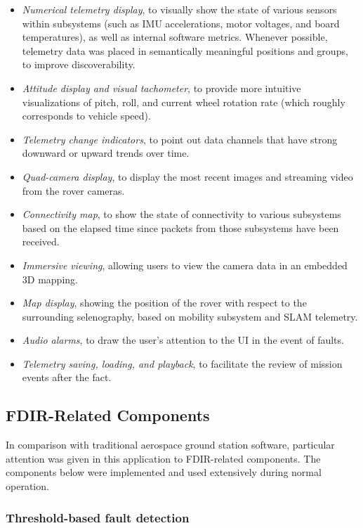 \begin{itemize}
    \item \textit{Numerical telemetry display}, to visually show the state of various sensors within subsystems (such as IMU accelerations, motor voltages, and board temperatures), as well as internal software metrics. Whenever possible, telemetry data was placed in semantically meaningful positions and groups, to improve discoverability.
    \item \textit{Attitude display and visual tachometer}, to provide more intuitive visualizations of pitch, roll, and current wheel rotation rate (which roughly corresponds to vehicle speed).
    \item \textit{Telemetry change indicators}, to point out data channels that have strong downward or upward trends over time.
    \item \textit{Quad-camera display}, to display the most recent images and streaming video from the rover cameras.
    \item \textit{Connectivity map}, to show the state of connectivity to various subsystems based on the elapsed time since packets from those subsystems have been received.
    \item \textit{Immersive viewing}, allowing users to view the camera data in an embedded 3D mapping.
    \item \textit{Map display}, showing the position of the rover with respect to the surrounding selenography, based on mobility subsystem and SLAM telemetry.
    \item \textit{Audio alarms}, to draw the user's attention to the UI in the event of faults.
    \item \textit{Telemetry saving, loading, and playback}, to facilitate the review of mission events after the fact.
\end{itemize}

\subsection{FDIR-Related Components}

In comparison with traditional aerospace ground station software, particular attention was given in this application to FDIR-related components. The components below were implemented and used extensively during normal operation.

\subsubsection{Threshold-based fault detection}

